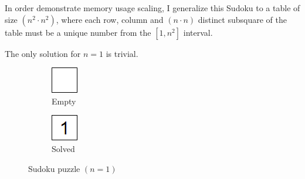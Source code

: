In order demonstrate memory usage scaling, I generalize this Sudoku to a table of size $(n^2\cdot{} n^2)$, where each row, column and $(n\cdot{}n)$ distinct subsquare of the table must be a unique number from the $[1, n^2]$ interval.

The only solution for $n=1$ is trivial.

\begin{figure}[H]
  \centering
  \begin{subfigure}{.4\linewidth}
  \end{subfigure}
  \begin{subfigure}{.1\linewidth}
    \centering
    \includegraphics[width=0.6\linewidth]{content/assets/03_grovers_algorithm/sudoku_1_empty.png}
    \caption{Empty}
  \end{subfigure}
  \begin{subfigure}{.1\linewidth}
    \centering
    \includegraphics[width=0.6\linewidth]{content/assets/03_grovers_algorithm/sudoku_1_solution.png}
    \caption{Solved}
  \end{subfigure}
  \begin{subfigure}{.4\linewidth}
  \end{subfigure}
  \caption{Sudoku puzzle $(n=1)$}
\end{figure}

